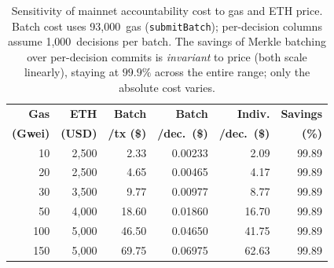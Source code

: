 \begin{table}[t]
\centering
\caption{Sensitivity of mainnet accountability cost to gas and ETH price.
Batch cost uses 93,000~gas (\texttt{submitBatch}); per-decision
columns assume 1,000~decisions per batch. The savings of
Merkle batching over per-decision commits is \emph{invariant} to price (both scale
linearly), staying at $99.9\%$ across the entire range; only the absolute cost varies.}
\label{tab:cost_sensitivity}
\small
\begin{tabular}{rrrrrr}
\toprule
\textbf{Gas} & \textbf{ETH} & \textbf{Batch} & \textbf{Batch} & \textbf{Indiv.} & \textbf{Savings} \\
\textbf{(Gwei)} & \textbf{(USD)} & \textbf{/tx (\$)} & \textbf{/dec.\ (\$)} & \textbf{/dec.\ (\$)} & \textbf{(\%)} \\
\midrule
10 & 2,500 & 2.33 & 0.00233 & 2.09 & 99.89 \\
20 & 2,500 & 4.65 & 0.00465 & 4.17 & 99.89 \\
30 & 3,500 & 9.77 & 0.00977 & 8.77 & 99.89 \\
50 & 4,000 & 18.60 & 0.01860 & 16.70 & 99.89 \\
100 & 5,000 & 46.50 & 0.04650 & 41.75 & 99.89 \\
150 & 5,000 & 69.75 & 0.06975 & 62.63 & 99.89 \\
\bottomrule
\end{tabular}
\end{table}
